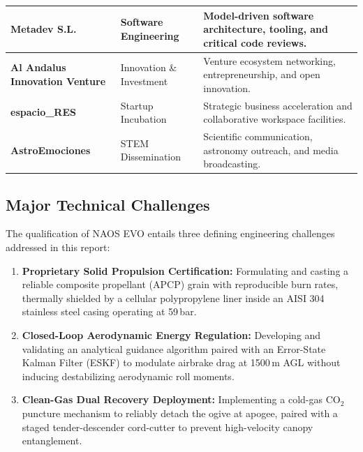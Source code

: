 \documentclass[11pt, a4paper]{article} %
\begin{document}
\begin{table}[H]
\begin{tabularx}{\textwidth}{|>{\raggedright\arraybackslash}p{4.2cm}|>{\raggedright\arraybackslash}p{3.8cm}|X|}
\rowcolor{LightGrayTable}
\textbf{Metadev S.L.} & Software Engineering & Model-driven software architecture, tooling, and critical code reviews. \\ \hline
\textbf{Al Andalus Innovation Venture} & Innovation \& Investment & Venture ecosystem networking, entrepreneurship, and open innovation. \\ \hline
\rowcolor{LightGrayTable}
\textbf{espacio\_RES} & Startup Incubation & Strategic business acceleration and collaborative workspace facilities. \\ \hline
\textbf{AstroEmociones} & STEM Dissemination & Scientific communication, astronomy outreach, and media broadcasting. \\ \hline
\end{tabularx}
\end{table}

\subsection{Major Technical Challenges}
The qualification of NAOS EVO entails three defining engineering challenges addressed in this report:
\begin{enumerate}[noitemsep, topsep=1pt]
    \item \textbf{Proprietary Solid Propulsion Certification:} Formulating and casting a reliable composite propellant (APCP) grain with reproducible burn rates, thermally shielded by a cellular polypropylene liner inside an AISI 304 stainless steel casing operating at 59\,bar.
    \item \textbf{Closed-Loop Aerodynamic Energy Regulation:} Developing and validating an analytical guidance algorithm paired with an Error-State Kalman Filter (ESKF) to modulate airbrake drag at 1500\,m AGL without inducing destabilizing aerodynamic roll moments.
    \item \textbf{Clean-Gas Dual Recovery Deployment:} Implementing a cold-gas $\text{CO}_2$ puncture mechanism to reliably detach the ogive at apogee, paired with a staged tender-descender cord-cutter to prevent high-velocity canopy entanglement.
\end{enumerate}


\end{document}
